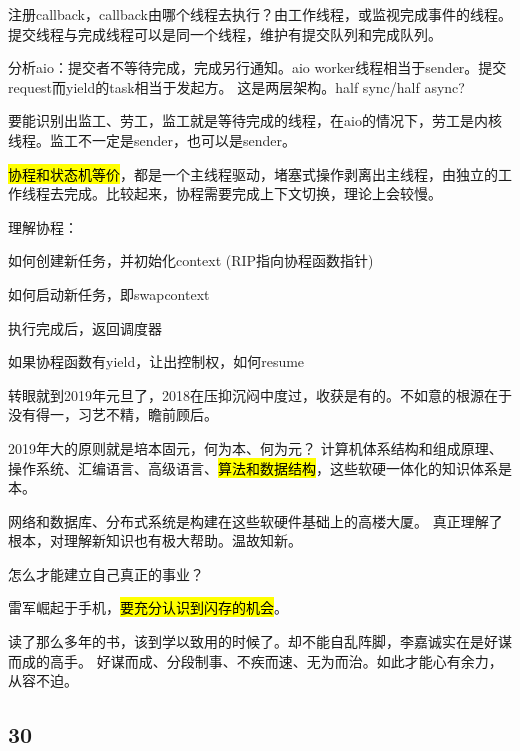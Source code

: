 注册callback，callback由哪个线程去执行？由工作线程，或监视完成事件的线程。
提交线程与完成线程可以是同一个线程，维护有提交队列和完成队列。

分析aio：提交者不等待完成，完成另行通知。aio worker线程相当于sender。提交request而yield的task相当于发起方。
这是两层架构。half sync/half async?

要能识别出监工、劳工，监工就是等待完成的线程，在aio的情况下，劳工是内核线程。监工不一定是sender，也可以是sender。

\hl{协程和状态机等价}，都是一个主线程驱动，堵塞式操作剥离出主线程，由独立的工作线程去完成。比较起来，协程需要完成上下文切换，理论上会较慢。

\dotfill

理解协程：
\begin{enumbox}
\item 如何创建新任务，并初始化context (RIP指向协程函数指针)
\item 如何启动新任务，即swapcontext
\item 执行完成后，返回调度器
\item 如果协程函数有yield，让出控制权，如何resume
\end{enumbox}

\dotfill

转眼就到2019年元旦了，2018在压抑沉闷中度过，收获是有的。不如意的根源在于没有得一，习艺不精，瞻前顾后。

2019年大的原则就是培本固元，何为本、何为元？
计算机体系结构和组成原理、操作系统、汇编语言、高级语言、\hl{算法和数据结构}，这些软硬一体化的知识体系是本。

网络和数据库、分布式系统是构建在这些软硬件基础上的高楼大厦。
真正理解了根本，对理解新知识也有极大帮助。温故知新。

\dotfill

怎么才能建立自己真正的事业？

雷军崛起于手机，\hl{要充分认识到闪存的机会}。

读了那么多年的书，该到学以致用的时候了。却不能自乱阵脚，李嘉诚实在是好谋而成的高手。
好谋而成、分段制事、不疾而速、无为而治。如此才能心有余力，从容不迫。

\subsection{30}
